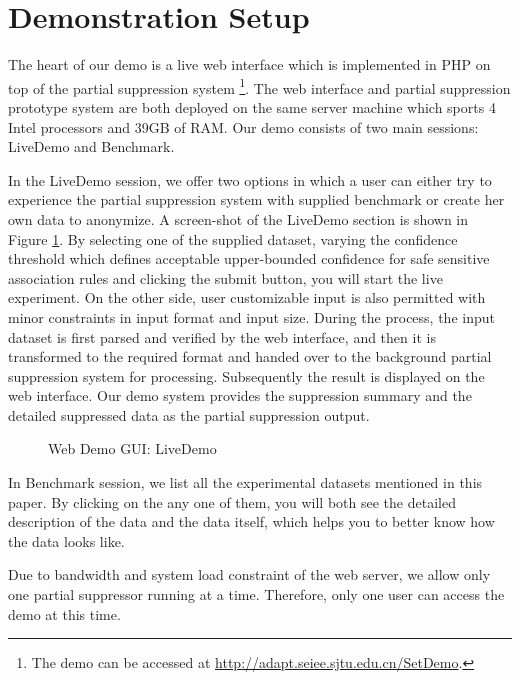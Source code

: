 \section{Demonstration Setup}
\label{sec:demo}

The heart of our demo is a live web interface which is 
implemented in PHP on top of the
partial suppression system \footnote{The demo can be accessed at
\url{http://adapt.seiee.sjtu.edu.cn/SetDemo}.}. The web interface and
partial suppression prototype system are both deployed on the same 
server machine which sports 4 Intel processors and 39GB of RAM. 
Our demo consists of two main sessions:
LiveDemo and Benchmark.

In the LiveDemo session, we offer two options in which a user can either try
to experience the partial suppression system with supplied benchmark or
create her own data to anonymize. A screen-shot of the LiveDemo section is
shown in Figure \ref{fig:gui}. By selecting one of the supplied dataset,
varying the confidence threshold which defines acceptable upper-bounded
confidence for safe sensitive association rules and clicking the submit
button, you will start the live experiment. On the other side, user
customizable input is also permitted with minor constraints in input format
and input size. During the process, the input dataset is first parsed and
verified by the web interface, and then it is transformed to the required
format and handed over to the background partial suppression system 
for processing. Subsequently the result is displayed on the
web interface. Our demo system provides the suppression summary
and the detailed suppressed data as the partial suppression output.

\begin{figure}[th]
	\centering
\caption{Web Demo GUI: LiveDemo}
\label{fig:gui}
\end{figure}

In Benchmark session, we list all the experimental datasets mentioned in this
paper. By clicking on the any one of them, you will both see the detailed
description of the data and the data itself, which helps you to better know
how the data looks like.


Due to bandwidth and system load constraint of the web server,
we allow only one partial suppressor running at a time. Therefore, only one
user can access the demo at this time.
